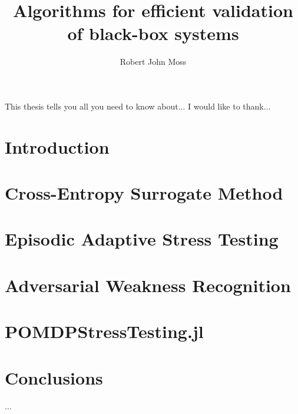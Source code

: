 \documentclass{report}
\begin{document}
\title{Algorithms for efficient validation of black-box systems}
\author{Robert John Moss}

\beforepreface
{}
This thesis tells you all you need to know about...
I would like to thank...
\afterpreface

\chapter{Introduction}


\chapter{Cross-Entropy Surrogate Method} %


\chapter{Episodic Adaptive Stress Testing}


\chapter{Adversarial Weakness Recognition}


\chapter{POMDPStressTesting.jl}


\chapter{Conclusions}
...

\appendix


% 
% 
\printbibliography
\end{document}
